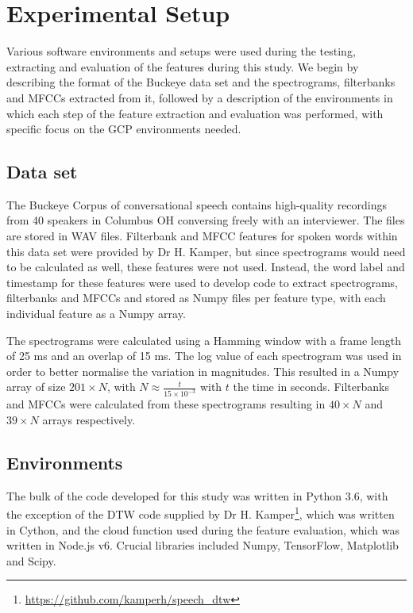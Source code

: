 \chapter{Experimental Setup}
\label{chap:experimental_setup}

Various software environments and setups were used during the testing, extracting and evaluation of the features during this study.
We begin by describing the format of the Buckeye data set and the spectrograms, filterbanks and MFCCs extracted from it, followed by a description of the environments in which each step of the feature extraction and evaluation was performed, with specific focus on the GCP environments needed.

\section{Data set}

The Buckeye Corpus of conversational speech contains high-quality recordings from 40 speakers in Columbus OH conversing freely with an interviewer. 
The files are stored in WAV files.
Filterbank and MFCC features for spoken words within this data set were provided by Dr H. Kamper, but since spectrograms would need to be calculated as well, these features were not used. 
Instead, the word label and timestamp for these features were used to develop code to extract spectrograms, filterbanks and MFCCs and stored as Numpy files per feature type, with each individual feature as a Numpy array.

The spectrograms were calculated using a Hamming window with a frame length of 25 ms and an overlap of 15 ms.
The log value of each spectrogram was used in order to better normalise the variation in magnitudes.
This resulted in a Numpy array of size $201 \times N$, with $N \approx \frac{t}{15\times10^{-3}}$ with $t$ the time in seconds.
Filterbanks and MFCCs were calculated from these spectrograms resulting in $40 \times N$ and $39 \times N$ arrays respectively.

\section{Environments}

The bulk of the code developed for this study was written in Python 3.6, with the exception of the DTW code supplied by Dr H. Kamper\footnote{\url{https://github.com/kamperh/speech_dtw}}, which was written in Cython, and the cloud function used during the feature evaluation, which was written in Node.js v6.
Crucial libraries included Numpy, TensorFlow, Matplotlib and Scipy.


